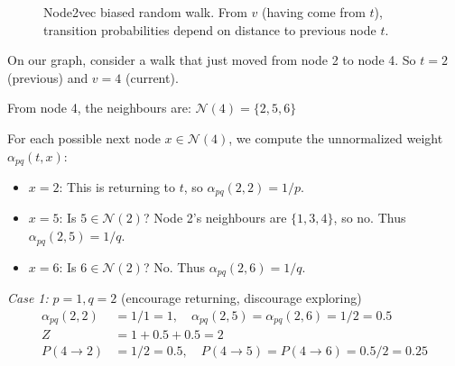 \begin{notechapter}
\begin{figure}[htbp]
\caption{Node2vec biased random walk. From $v$ (having come from $t$), transition probabilities depend on distance to previous node $t$.}
\label{shallow-embeddings:fig:node2vec_walk}
\end{figure}

\begin{example}
On our graph, consider a walk that just moved from node 2 to node 4. So $t = 2$ (previous) and $v = 4$ (current).

From node 4, the neighbours are: $\mathcal{N}(4) = \{2, 5, 6\}$

For each possible next node $x \in \mathcal{N}(4)$, we compute the unnormalized weight $\alpha_{pq}(t, x)$:
\begin{itemize}
    \item $x = 2$: This is returning to $t$, so $\alpha_{pq}(2, 2) = 1/p$.
    \item $x = 5$: Is $5 \in \mathcal{N}(2)$? Node 2's neighbours are $\{1, 3, 4\}$, so no. Thus $\alpha_{pq}(2, 5) = 1/q$.
    \item $x = 6$: Is $6 \in \mathcal{N}(2)$? No. Thus $\alpha_{pq}(2, 6) = 1/q$.
\end{itemize}

\emph{Case 1:} $p=1, q=2$ (encourage returning, discourage exploring)
\begin{align*}
\alpha_{pq}(2,2) &= 1/1 = 1, \quad \alpha_{pq}(2,5) = \alpha_{pq}(2,6) = 1/2 = 0.5 \\
Z &= 1 + 0.5 + 0.5 = 2 \\
P(4 \to 2) &= 1/2 = 0.5, \quad P(4 \to 5) = P(4 \to 6) = 0.5/2 = 0.25
\end{align*}


\end{example}
\end{notechapter}
